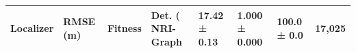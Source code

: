\begin{tabular}{lllll}
\toprule
Localizer & RMSE (m) & Fitness & Det. (%
\midrule
NRI-Graph & 17.42 ± 0.13 & 1.000 ± 0.000 & 100.0 ± 0.0 & 17,025 \\
\bottomrule
\end{tabular}

